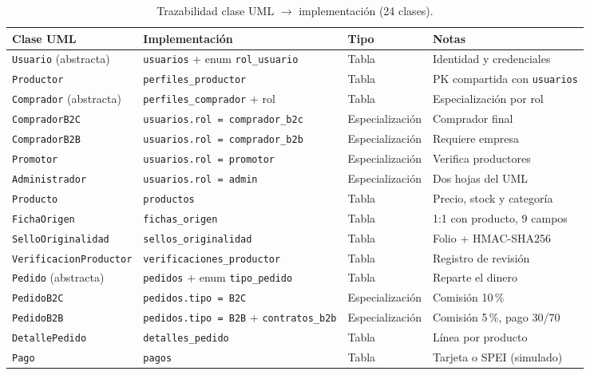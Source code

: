 \documentclass[conference,letterpaper,onecolumn]{IEEEtran}
\begin{document}
\begin{table}[H]
\caption{Trazabilidad clase UML $\rightarrow$ implementación (24 clases).}
\label{tab:traza}
\centering
\footnotesize
\renewcommand{\arraystretch}{1.05}
\begin{tabular}{@{}L{0.19\textwidth}L{0.25\textwidth}L{0.19\textwidth}L{0.22\textwidth}@{}}
\toprule
\textbf{Clase UML} & \textbf{Implementación} & \textbf{Tipo} & \textbf{Notas} \\
\midrule
\texttt{Usuario} (abstracta) & \texttt{usuarios} + enum \texttt{rol\_usuario} & Tabla & Identidad y credenciales \\
\texttt{Productor} & \nolinkurl{perfiles_productor} & Tabla & PK compartida con \texttt{usuarios} \\
\texttt{Comprador} (abstracta) & \nolinkurl{perfiles_comprador} + rol & Tabla & Especialización por rol \\
\texttt{CompradorB2C} & \texttt{usuarios.rol = comprador\_b2c} & Especialización & Comprador final \\
\texttt{CompradorB2B} & \texttt{usuarios.rol = comprador\_b2b} & Especialización & Requiere empresa \\
\texttt{Promotor} & \texttt{usuarios.rol = promotor} & Especialización & Verifica productores \\
\texttt{Administrador} & \texttt{usuarios.rol = admin} & Especialización & Dos hojas del UML \\
\texttt{Producto} & \texttt{productos} & Tabla & Precio, stock y categoría \\
\texttt{FichaOrigen} & \nolinkurl{fichas_origen} & Tabla & 1:1 con producto, 9 campos \\
\texttt{SelloOriginalidad} & \nolinkurl{sellos_originalidad} & Tabla & Folio + HMAC-SHA256 \\
\texttt{VerificacionProductor} & \nolinkurl{verificaciones_productor} & Tabla & Registro de revisión \\
\texttt{Pedido} (abstracta) & \texttt{pedidos} + enum \texttt{tipo\_pedido} & Tabla & Reparte el dinero \\
\texttt{PedidoB2C} & \texttt{pedidos.tipo = B2C} & Especialización & Comisión 10\,\% \\
\texttt{PedidoB2B} & \texttt{pedidos.tipo = B2B} + \nolinkurl{contratos_b2b} & Especialización & Comisión 5\,\%, pago 30/70 \\
\texttt{DetallePedido} & \nolinkurl{detalles_pedido} & Tabla & Línea por producto \\
\texttt{Pago} & \texttt{pagos} & Tabla & Tarjeta o SPEI (simulado) \\

\end{tabular}
\end{table}
\end{document}
